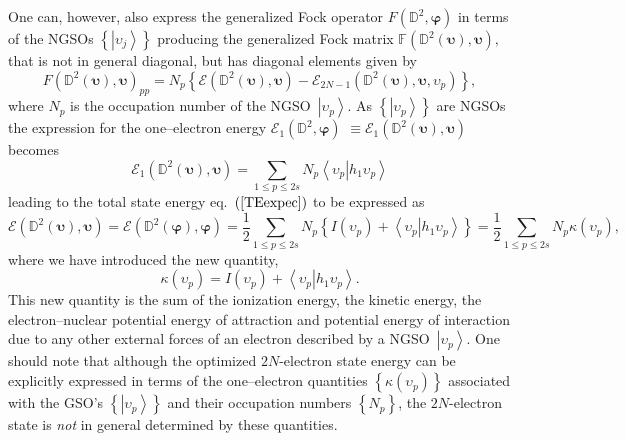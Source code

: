 \documentclass[aps,preprint]{revtex4}%
\begin{document}
One can, however, also express the generalized Fock operator $F\left(
\mathbb{D}^{2},\boldsymbol{\varphi}\right)  $ in terms of the NGSOs $\left\{
\left\vert \upsilon_{j}\right\rangle \right\}  $ producing the generalized
Fock matrix $\mathbb{F}\left(  \mathbb{D}^{2}\left(  \boldsymbol{\upsilon
}\right)  ,\boldsymbol{\upsilon}\right)  ,$ that is not in general diagonal,
but has diagonal elements given by
\begin{equation}
F\left(  \mathbb{D}^{2}\left(  \boldsymbol{\upsilon}\right)
,\boldsymbol{\upsilon}\right)  _{pp}=N_{p}\left\{  \mathcal{E}\left(
\mathbb{D}^{2}\left(  \boldsymbol{\upsilon}\right)  ,\boldsymbol{\upsilon
}\right)  -\mathcal{E}_{2N-1}\left(  \mathbb{D}^{2}\left(
\boldsymbol{\upsilon}\right)  ,\boldsymbol{\upsilon,}\upsilon_{p}\right)
\right\}  ,
\end{equation}
where $N_{p}$ is the occupation number of the NGSO\ $\left\vert \upsilon
_{p}\right\rangle $. As $\left\{  \left\vert \upsilon_{p}\right\rangle
\right\}  $ are NGSOs the expression for the one--electron energy
$\mathcal{E}_{1}\left(  \mathbb{D}^{2},\boldsymbol{\varphi}\right)  $
$\equiv\mathcal{E}_{1}\left(  \mathbb{D}^{2}\left(  \boldsymbol{\upsilon
}\right)  ,\boldsymbol{\upsilon}\right)  $ becomes%
\begin{equation}
\mathcal{E}_{1}\left(  \mathbb{D}^{2}\left(  \boldsymbol{\upsilon}\right)
,\boldsymbol{\upsilon}\right)  =\sum_{1\leq p\leq2s}N_{p}\left\langle \left.
\upsilon_{p}\right\vert h_{1}\upsilon_{p}\right\rangle
\end{equation}
leading to the total state energy eq.\ $\left(  \ref{TEexpec}\right)  $ to be
expressed as
\begin{equation}
\mathcal{E}\left(  \mathbb{D}^{2}\left(  \boldsymbol{\upsilon}\right)
,\boldsymbol{\upsilon}\right)  =\mathcal{E}\left(  \mathbb{D}^{2}\left(
\boldsymbol{\varphi}\right)  ,\boldsymbol{\varphi}\right)  =\frac{1}{2}%
\sum_{1\leq p\leq2s}N_{p}\left\{  I\left(  \upsilon_{p}\right)  +\left\langle
\left.  \upsilon_{p}\right\vert h_{1}\upsilon_{p}\right\rangle \right\}
=\frac{1}{2}%
{\textstyle\sum\limits_{1\leq p\leq2s}}
N_{p}\kappa\left(  \upsilon_{p}\right)  , \label{Enkappa}%
\end{equation}
where we have introduced the new quantity,
\begin{equation}
\kappa\left(  \upsilon_{p}\right)  =I\left(  \upsilon_{p}\right)
+\left\langle \left.  \upsilon_{p}\right\vert h_{1}\upsilon_{p}\right\rangle .
\label{kappa}%
\end{equation}
This new quantity is the sum of the ionization energy, the kinetic energy, the
electron--nuclear potential energy of attraction and potential energy of
interaction due to any other external forces of an electron described by a
NGSO\ $\left\vert \upsilon_{p}\right\rangle $. One should note that although
the optimized $2N$-electron state energy can be explicitly expressed in terms
of the one--electron quantities $\left\{  \kappa\left(  \upsilon_{p}\right)
\right\}  $ associated with the GSO's $\left\{  \left\vert \upsilon
_{p}\right\rangle \right\}  $ and their occupation numbers $\left\{
N_{p}\right\}  $, the $2N$-electron state is \emph{not }in general determined
by these quantities.
\end{document}
